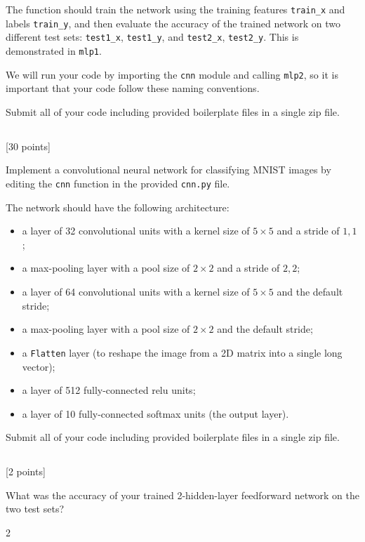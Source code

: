 \documentclass[12pt]{article}
\newcommand{\nin}{\noindent}
\newcommand{\tcv}[1]{\textcolor{m4}{#1}}
\newcounter{totalpoints}
\newcommand{\points}[1]{{\addtocounter{totalpoints}{#1}\tcv{[#1 points]}}}
\begin{document}
{The function should train the network using the training features \verb|train_x| and labels \verb|train_y|, and then evaluate the accuracy of the trained network on two different test sets: \verb|test1_x|, \verb|test1_y|, and \verb|test2_x|, \verb|test2_y|.
This is demonstrated in \verb|mlp1|.

We will run your code by importing the \verb|cnn| module and calling \verb|mlp2|, so it is important that your code follow these naming conventions.

Submit all of your code including provided boilerplate files in a single zip file.


\subsection{}
\points{30}
Implement a convolutional neural network for classifying MNIST images by editing the \verb|cnn| function in the provided \texttt{cnn.py} file.

The network should have the following architecture:
\begin{itemize}
    \item a layer of 32 convolutional units with a kernel size of $5\times5$ and a stride of $1,1$;
    \item a max-pooling layer with a pool size of $2\times2$ and a stride of $2,2$;
    \item a layer of 64 convolutional units with a kernel size of $5\times5$ and the default stride;
    \item a max-pooling layer with a pool size of $2\times2$ and the default stride;
    \item a \verb|Flatten| layer (to reshape the image from a 2D matrix into a single long vector);
    \item a layer of 512 fully-connected relu units;
    \item a layer of 10 fully-connected softmax units (the output layer).
\end{itemize}

\nin Submit all of your code including provided boilerplate files in a single zip file.


\subsection{}
\points{2}
What was the accuracy of your trained 2-hidden-layer feedforward network on the two test sets?

\begin{answer}{2\baselineskip}
\end{answer}

}
\end{document}
